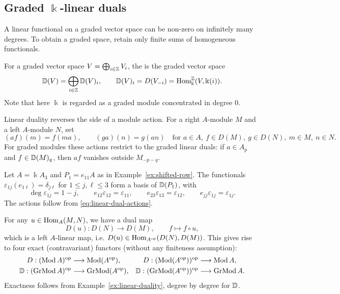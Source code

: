 
\subsection{\texorpdfstring{Graded $\Bbbk$-linear duals}{Graded k-linear duals}}

A linear functional on a graded vector space can be non-zero on infinitely many degrees.
To obtain a graded space, retain only finite sums of homogeneous functionals.

\begin{definition}\label{def:linear-duals}
For a graded vector space $V=\bigoplus_{i\in\mathbb{Z}}V_i$, the  is the graded vector space
\[
\mathbb{D}(V)=\bigoplus_{i\in\mathbb{Z}}\mathbb{D}(V)_i,
\qquad \mathbb{D}(V)_i=D(V_{-i})=\operatorname{Hom}\nolimits_\Bbbk^{\mathbb{Z}}(V,\Bbbk(i)).
\]
Note that here $\Bbbk$ is regarded as a graded module concentrated in degree $0$.
\end{definition}

Linear duality reverses the side of a module action.
For a right $A$-module $M$ and a left $A$-module $N$, set
\begin{equation}\label{eq:linear-dual-actions}
(af)(m)=f(ma),\qquad (ga)(n)=g(an)
\quad\text{for }a\in A,\ f\in D(M),\ g\in D(N),\ m\in M,\ n\in N.
\end{equation}
For graded modules these actions restrict to the graded linear duals: if $a\in A_p$ and $f\in\mathbb{D}(M)_q$, then $af$ vanishes outside $M_{-p-q}$.


\begin{example}\label{ex:row-linear-dual}
Let $A=\Bbbk A_3$ and $P_1=e_{11}A$ as in Example~\ref{ex:shifted-row}.
The functionals $\varepsilon_{1j}(e_{1\ell})=\delta_{j\ell}$ for $1\leq j,\ell\leq 3$ form a basis of $\mathbb{D}(P_1)$, with
\[
\deg\varepsilon_{1j}=1-j,\qquad
e_{12}\varepsilon_{12}=\varepsilon_{11},\qquad
e_{23}\varepsilon_{13}=\varepsilon_{12},\qquad
e_{jj}\varepsilon_{1j}=\varepsilon_{1j}.
\]
The actions follow from \eqref{eq:linear-dual-actions}.
\end{example}


For any $u\in \operatorname{Hom}\nolimits_A(M,N)$, we have a dual map
\[D(u):D(N)\to D(M), \qquad f\mapsto f\circ u,
\] 
which is a left $A$-linear map, i.e. $D(u)\in \operatorname{Hom}\nolimits_{A^{\mathrm{op}}}(D(N), D(M))$.
This gives rise to four exact (contravariant) functors (without any finiteness assumption):
\begin{equation}\label{eq:linear-dual-functors}
\begin{aligned}
D:(\operatorname{\mathrm{Mod}} A)^{\mathrm{op}}&\longrightarrow\operatorname{\mathrm{Mod}}(A^{\mathrm{op}}),
&D:(\operatorname{\mathrm{Mod}}(A^{\mathrm{op}}))^{\mathrm{op}}&\longrightarrow\operatorname{\mathrm{Mod}} A,\\
\mathbb{D}:(\operatorname{\mathrm{GrMod}} A)^{\mathrm{op}}&\longrightarrow\operatorname{\mathrm{GrMod}}(A^{\mathrm{op}}),
&\mathbb{D}:(\operatorname{\mathrm{GrMod}}(A^{\mathrm{op}}))^{\mathrm{op}}&\longrightarrow\operatorname{\mathrm{GrMod}} A.
\end{aligned}
\end{equation}
Exactness follows from Example~\ref{ex:linear-duality}, degree by degree for $\mathbb{D}$.

